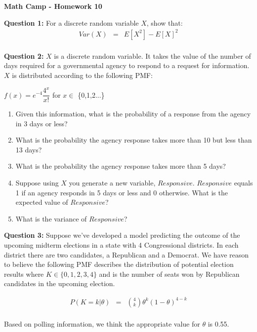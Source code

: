\documentclass[11pt]{article}
\begin{document}
\centerline{\bf Math Camp - Homework 10}

\textbf{Question 1:}
For a discrete random variable $X$, show that:
\begin{eqnarray*}
Var(X) &=& E[X^2] - E[X]^2\\
\end{eqnarray*}


\textbf{Question 2:}
$X$ is a discrete random variable. It takes the value of the number of days required for a governmental agency to respond to a request for information. $X$ is distributed according to the following PMF:\\
\bigskip

$f(x) = e^{-4} \dfrac{4^x}{x!}$ for $x \in$ \{0,1,2...\} \\

\begin{enumerate}
\item Given this information, what is the probability of a response from the agency in 3 days or less?
\item What is the probability the agency response takes more than 10 but less than 13 days?
\item What is the probability the agency response takes more than 5 days? 
\item Suppose using $X$ you generate a new variable, $Responsive$. $Responsive$ equals 1 if an agency responds in 5 days or less and 0 otherwise. What is the expected value of $Responsive$?
\item What is the variance of $Responsive$?
\end{enumerate}

\textbf{Question 3:}
Suppose we've developed a model predicting the outcome of the upcoming midterm elections in a state with 4 Congressional districts. In each district there are two candidates, a Republican and a Democrat. We have reason to believe the following PMF describes the distribution of potential election results where $K \in \{0,1,2,3,4\}$ and is the number of seats won by Republican candidates in the upcoming election. 

\begin{eqnarray*}
P(K=k | \theta) &=& \binom{4}{k} \theta^{k} (1-\theta)^{4-k}\\
\end{eqnarray*}

Based on polling information, we think the appropriate value for $\theta$ is 0.55. 
\end{document}
